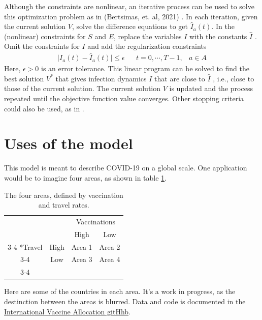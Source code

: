 \documentclass{article}
\begin{document}
Although the constraints are nonlinear, an iterative process can be used to solve this optimization problem as in  (Bertsimas, et. al, 2021) \cite{a1}. In each iteration, given the current solution $V$, solve the difference equations to get $\hat{I}_a(t)$. In the (nonlinear) constraints for $S$ and $E$, replace the variables $I$ with the constants $\hat{I}$ . Omit the constraints for $I$ and add the regularization constraints
\begin{equation}
\begin{array}{clrr}
    \mid I_a(t) - \hat{I}_a(t) \mid \leq \epsilon & & t = 0, \cdots, T-1, & a \in A
    \end{array}
\end{equation}
Here, $\epsilon > 0$ is an error tolerance. This linear program can be solved to find the best solution $V^*$ that gives infection dynamics $I$ that are close to $\hat{I}$ , i.e., close to those of the current solution. The current solution $V$ is updated and the process repeated until the objective function value converges. Other stopping criteria could also be used, as in \cite{a1}.

\section{Uses of the model}
This model is meant to describe COVID-19 on a global scale. One application would be to imagine four areas, as shown in table \ref{tab:four-areas}.\\

\begin{table}
\centering
    \setlength{\extrarowheight}{2pt}
    \begin{tabular}{cc|c|c|}
      & \multicolumn{1}{c}{} & \multicolumn{2}{c}{Vaccinations}\\
      & \multicolumn{1}{c}{} & \multicolumn{1}{c}{High}  & \multicolumn{1}{c}{Low} \\\cline{3-4}
      \multirow{2}*{Travel}  & High & Area 1 & Area 2 \\\cline{3-4}
      & Low & Area 3 & Area 4 \\\cline{3-4}
    \end{tabular}
    \caption{The four areas, defined by vaccination and travel rates.}
\label{tab:four-areas}
  \end{table}
Here are some of the countries in each area. It's a work in progress, as the destinction between the areas is blurred. Data and code is documented in the  \href{https://github.com/Stonepaw90/international-vaccine-allocation}{International Vaccine Allocation gitHhb}.
\end{document}
